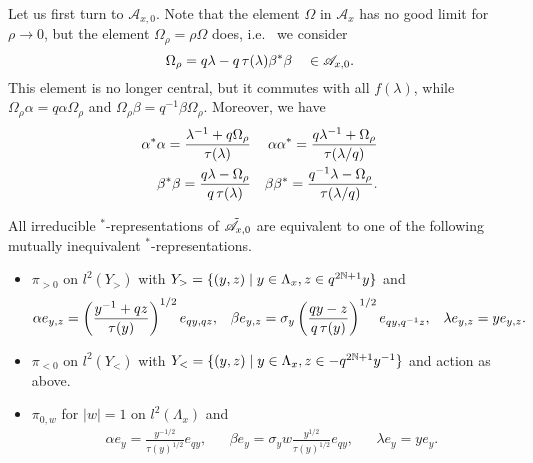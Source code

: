 Let us first turn to $\mathscr{A}_{x,0}$. Note that the element $\Omega$ in $\mathscr{A}_x$ has no good limit for $\rho \rightarrow 0$, but the element $\Omega_{\rho} = \rho \Omega$ does, i.e.~ we consider \[\Omega_{\rho} =  q\lambda - q\operatorname{\tau}(\lambda)\beta^*\beta \quad \in \mathscr{A}_{x,0}.\] This element is no longer central, but it commutes with all $f(\lambda)$, while $\Omega_{\rho}\alpha = q\alpha \Omega_{\rho}$ and $\Omega_{\rho}\beta = q^{-1}\beta \Omega_{\rho}$. Moreover, we have \begin{align*} 
\alpha^*\alpha = \frac{\lambda^{-1}+q\Omega_{\rho}}{\operatorname{\tau}(\lambda)} && \alpha\alpha^* = \frac{q\lambda^{-1}+\Omega_{\rho}}{\operatorname{\tau}(\lambda/q)}\\ 
\beta^*\beta = \frac{q\lambda-\Omega_{\rho}}{q\operatorname{\tau}(\lambda)}&& \beta\beta^* =  \frac{q^{-1}\lambda-\Omega_{\rho}}{\operatorname{\tau}(\lambda/q)}.
\end{align*} 

\begin{Lem} All irreducible $^*$-representations of $\tilde{\mathscr{A}}_{x,0}$ are equivalent to one of the following mutually inequivalent $^*$-representations.
\begin{itemize} 
\item $\pi_{>0}$ on $l^2(Y_>)$ with $Y_> = \{(y,z)\mid y\in \Lambda_x,z\in q^{2\mathbb{N}+1}y\}$ and  \begin{align*} \alpha e_{y,z} =  \left(\frac{y^{-1}+qz}{\operatorname{\tau}(y)}\right)^{1/2}e_{qy,qz}, && \beta e_{y,z} = \sigma_y \left(\frac{qy-z}{q\operatorname{\tau}(y)}\right)^{1/2}e_{qy,q^{-1}z},&& \lambda e_{y,z} = ye_{y,z}.\end{align*}
\item $\pi_{<0}$ on $l^2(Y_<)$ with $Y_< = \{(y,z)\mid y\in \Lambda_x,z \in -q^{2\mathbb{N}+1}y^{-1}\}$ and action as above.
\item $\pi_{0,w}$ for $|w| = 1$ on $l^2(\Lambda_x)$ and \begin{align*} \alpha e_y = \frac{y^{-1/2}}{\tau(y)^{1/2}}e_{qy},&& \beta e_y = \sigma_y w\frac{y^{1/2}}{\tau(y)^{1/2}}e_{qy},&& \lambda e_{y} = ye_y.\end{align*}
\end{itemize}

\end{Lem}

